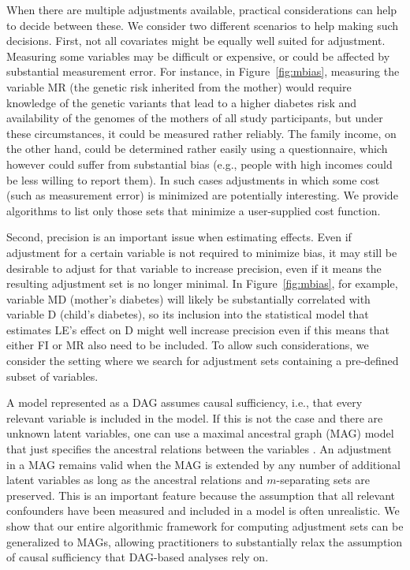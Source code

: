 When there are multiple adjustments available, practical considerations can help to decide between these. We consider two different scenarios to help making such decisions. First, not all covariates might be equally  well suited for adjustment. Measuring some variables may be difficult or expensive, or could be affected by substantial measurement error.
For instance, in Figure~\ref{fig:mbias}, measuring the variable MR 
(the genetic risk inherited from the mother)
would require knowledge of the genetic variants
that lead to a higher diabetes risk and availability of the genomes
of the mothers of all study participants, but under these circumstances, it could be 
measured rather reliably.  
The family income, on the other hand, could be determined rather easily
using a questionnaire, which however could suffer from substantial 
bias (e.g., people with high incomes could be less willing to report them). In such cases adjustments in which some cost (such as measurement error) is minimized are potentially interesting. We provide algorithms to list only those sets that minimize a user-supplied cost function.

	Second, precision is an important issue when estimating effects. Even if adjustment for a certain variable is not required to minimize bias, it may still be desirable to adjust for that variable to increase precision, even if it means the resulting adjustment set is no longer minimal. In Figure~\ref{fig:mbias}, for example, variable MD (mother's diabetes) will likely be substantially correlated with variable D (child's diabetes), so its inclusion into the statistical model that estimates LE's effect on D might well increase precision even if this means that either FI or MR also need to be included. To allow such considerations, we consider the setting where we search for adjustment sets containing a pre-defined subset of variables.

A model represented as a DAG assumes causal sufficiency, i.e., that every relevant variable is included in the model. If this is not the case and there are unknown latent variables, one can use a maximal ancestral graph (MAG) model that just specifies the ancestral relations between the variables \cite{Richardson2002}. An adjustment in a MAG remains valid when the MAG is extended by any number of additional latent variables as long as the ancestral relations and $m$-separating sets are preserved. This is an important feature because the assumption that all relevant confounders have been measured and included in a model is often unrealistic. 
%
%
%
We show that our entire algorithmic framework for computing adjustment sets can be generalized to MAGs, allowing practitioners to substantially relax the assumption of causal sufficiency that DAG-based analyses rely on.


